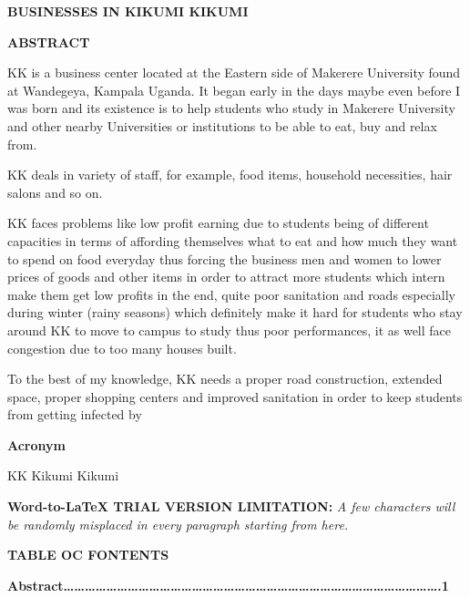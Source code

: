 \documentclass[16pt]{article}
\author{freza}
\title{}
\begin{document}
\begin{center}
\textbf{{\huge BUSINESSES IN KIKUMI KIKUMI}}
\end{center}

\begin{center}
\textbf{{\Huge ABSTRACT}}
\end{center}

{\raggedright
KK is a business center located at the Eastern side of Makerere University found
at Wandegeya, Kampala Uganda. It began early in the days maybe even before I was
born and its existence is to help students who study in Makerere University and
other nearby Universities or institutions to be able to eat, buy and relax from.
}

{\raggedright
KK deals in variety of staff, for example, food items, household necessities,
hair salons and so on.
}

{\raggedright
KK faces problems like low profit earning due to students being of different
capacities in terms of affording themselves what to eat and how much they want to
spend on food everyday thus forcing the business men and women to lower prices of
goods and other items in order to attract more students which intern make them
get low profits in the end, quite poor sanitation and roads especially during
winter (rainy seasons) which definitely make it hard for students who stay around
KK to move to campus to study thus poor performances, it as well face congestion
due to too many houses built.
}

{\raggedright
To the best of my knowledge, KK needs a proper road construction, extended
space, proper shopping centers and improved sanitation in order to keep students
from getting infected by
}

\begin{center}
\textbf{{\Huge Acronym}}
\end{center}

{\raggedright
KK       Kikumi Kikumi
}

\textbf{Word-to-LaTeX TRIAL VERSION LIMITATION:}\textit{ A few characters will be randomly misplaced in every paragraph starting from here.}

\begin{center}
\textbf{{\Huge TABLE OC FONTENTS}}
\end{center}

{\raggedright
\textbf{Abstract\ldots{}\ldots{}\ldots{}\ldots{}\ldots{}\ldots{}\ldots{}\ldots{}\ldots{}\ldots{}\ldots{}\ldots{}\ldots{}\ldots{}\ldots{}\ldots{}\ldots{}\ldots{}\ldots{}\ldots{}\ldots{}\ldots{}\ldots{}\ldots{}\ldots{}\ldots{}\ldots{}\ldots{}\ldots{}\ldots{}\ldots{}\ldots{}\ldots{}\ldots{}\ldots{}.1}
}
\end{document}
